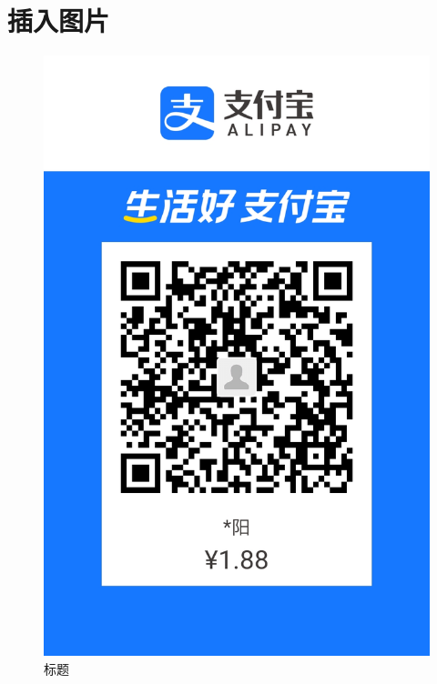 \documentclass{article}
\begin{document}
\section{插入图片}
\begin{figure}[hbt]%
  \centering
  \includegraphics[scale=0.2]{1.jpg}%
  \caption{标题}
\end{figure}  
\newpage
\end{document}

